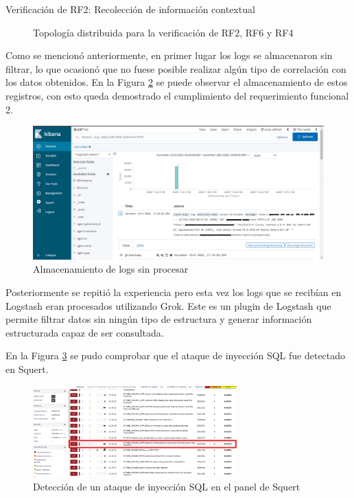 \begin{section}{Verificación de RF2: Recolección de información contextual}
\begin{figure}[H]
        \caption{Topología distribuida para la verificación de RF2, RF6 y RF4}
        \label{fig:figura_iter2_ataque}
    \end{figure}
    \FloatBarrier
    Como se mencionó anteriormente, en primer lugar los logs se almacenaron sin filtrar, lo que ocasionó que no fuese posible realizar algún tipo de correlación con los datos obtenidos. En la Figura \ref{fig:iter2_logs_crudos} se puede observar el almacenamiento de estos registros, con esto queda demostrado el cumplimiento del requerimiento funcional 2.
    \begin{figure}[H]
    \centering
        \includegraphics[width=1\textwidth]{./iteracion_2_imagenes/1_kibana_logs_1EDITADA.png}
        \caption{Almacenamiento de logs sin procesar}
        \label{fig:iter2_logs_crudos}
    \end{figure}
    Posteriormente se repitió la experiencia pero esta vez los logs que se recibían en Logstash eran procesados utilizando Grok. Este es un plugin de Logstash que permite filtrar datos sin ningún tipo de estructura y generar información estructurada capaz de ser consultada. \par
    En la Figura \ref{fig:figura_squert-sql} se pudo comprobar que el ataque de inyección SQL fue detectado en Squert.
    \begin{figure}[H]
    \centering
        \includegraphics[width=0.7\textwidth]{./iteracion_2_imagenes/squert-sql-injection.png}
        \caption{Detección de un ataque de inyección SQL en el panel de Squert}
        \label{fig:figura_squert-sql}
    \end{figure}
    

\end{section}
